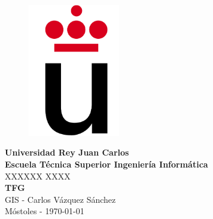 \setlength{\unitlength}{1 cm} %
\thispagestyle{empty}
\begin{figure}[htb]
\begin{center}
\includegraphics[width=4cm]{./imagenes/logoURJC}
\end{center}
\end{figure}
\begin{center}
\textbf{{\Huge Universidad Rey Juan Carlos}\\[0.5cm]
{\LARGE Escuela Técnica Superior Ingeniería Informática}}\\[1.25cm]
{\Large XXXXXX XXXX}\\[2.3cm]
{\LARGE \textbf{TFG}}\\[3cm]
{\large GIS - Carlos Vázquez Sánchez}\\[1cm]
Móstoles - \today
\end{center}